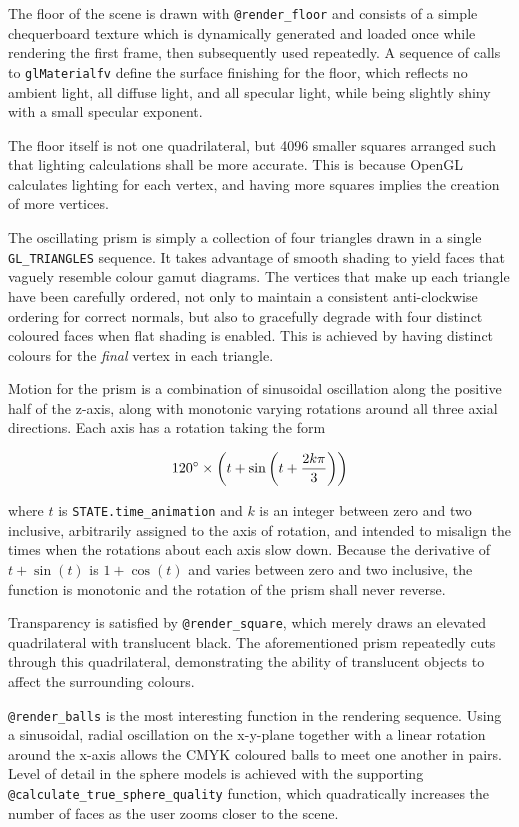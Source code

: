 \documentclass[a4paper,titlepage,12pt]{article}
\begin{document}
The floor of the scene is drawn with \texttt{@render\_floor} and consists of a
simple chequerboard texture which is dynamically generated and loaded once
while rendering the first frame, then subsequently used repeatedly. A sequence
of calls to \texttt{glMaterialfv} define the surface finishing for the floor,
which reflects no ambient light, all diffuse light, and all specular light,
while being slightly shiny with a small specular exponent.

The floor itself is not one quadrilateral, but 4096 smaller squares arranged
such that lighting calculations shall be more accurate. This is because OpenGL
calculates lighting for each vertex, and having more squares implies the
creation of more vertices.

The oscillating prism is simply a collection of four triangles drawn in a
single \texttt{GL\_TRIANGLES} sequence. It takes advantage of smooth shading to
yield faces that vaguely resemble colour gamut diagrams. The vertices that make
up each triangle have been carefully ordered, not only to maintain a consistent
anti-clockwise ordering for correct normals, but also to gracefully degrade
with four distinct coloured faces when flat shading is enabled. This is
achieved by having distinct colours for the \textit{final} vertex in each
triangle.

Motion for the prism is a combination of sinusoidal oscillation along the
positive half of the z-axis, along with monotonic varying rotations around all
three axial directions. Each axis has a rotation taking the form

$$120\degree\times\left(t+\sin\left(t+\frac{2k\pi}3\right)\right)$$

where $t$ is \texttt{STATE.time\_animation} and $k$ is an integer between zero
and two inclusive, arbitrarily assigned to the axis of rotation, and intended
to misalign the times when the rotations about each axis slow down. Because the
derivative of $t+\sin(t)$ is $1+\cos(t)$ and varies between zero and two
inclusive, the function is monotonic and the rotation of the prism shall never
reverse.

Transparency is satisfied by \texttt{@render\_square}, which merely draws an
elevated quadrilateral with translucent black. The aforementioned prism
repeatedly cuts through this quadrilateral, demonstrating the ability of
translucent objects to affect the surrounding colours.

\texttt{@render\_balls} is the most interesting function in the rendering
sequence. Using a sinusoidal, radial oscillation on the x-y-plane together with
a linear rotation around the x-axis allows the CMYK coloured balls to meet one
another in pairs. Level of detail in the sphere models is achieved with the
supporting \texttt{@calculate\_true\_sphere\_quality} function, which
quadratically increases the number of faces as the user zooms closer to the
scene.
\end{document}
